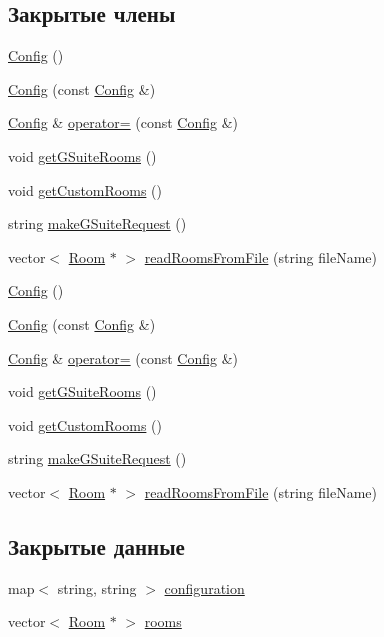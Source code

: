 \subsection*{Закрытые члены}
\begin{DoxyCompactItemize}
\item 
\hyperlink{class_config_abd0c571c116924871e30444b192b792a}{Config} ()
\item 
\hyperlink{class_config_add59e40b81cf0ffb43571bc201781dc0}{Config} (const \hyperlink{class_config}{Config} \&)
\item 
\hyperlink{class_config}{Config} \& \hyperlink{class_config_a301e8f32b1fad83bcab780bfa3fec1e9}{operator=} (const \hyperlink{class_config}{Config} \&)
\item 
void \hyperlink{class_config_a8a710b2b2b1e6280195389e9f84d0fba}{get\+G\+Suite\+Rooms} ()
\item 
void \hyperlink{class_config_af15e32047889f0d0e304cf4f5f218711}{get\+Custom\+Rooms} ()
\item 
string \hyperlink{class_config_a45dfcb0ab6def40b1ee15a0521a717ac}{make\+G\+Suite\+Request} ()
\item 
vector$<$ \hyperlink{class_room}{Room} $\ast$ $>$ \hyperlink{class_config_a585a61660c48877296ed9409c83b01c5}{read\+Rooms\+From\+File} (string file\+Name)
\item 
\hyperlink{class_config_abd0c571c116924871e30444b192b792a}{Config} ()
\item 
\hyperlink{class_config_add59e40b81cf0ffb43571bc201781dc0}{Config} (const \hyperlink{class_config}{Config} \&)
\item 
\hyperlink{class_config}{Config} \& \hyperlink{class_config_a301e8f32b1fad83bcab780bfa3fec1e9}{operator=} (const \hyperlink{class_config}{Config} \&)
\item 
void \hyperlink{class_config_a8a710b2b2b1e6280195389e9f84d0fba}{get\+G\+Suite\+Rooms} ()
\item 
void \hyperlink{class_config_af15e32047889f0d0e304cf4f5f218711}{get\+Custom\+Rooms} ()
\item 
string \hyperlink{class_config_a45dfcb0ab6def40b1ee15a0521a717ac}{make\+G\+Suite\+Request} ()
\item 
vector$<$ \hyperlink{class_room}{Room} $\ast$ $>$ \hyperlink{class_config_a8da1c4e1553854e6f248867f168de9ad}{read\+Rooms\+From\+File} (string file\+Name)
\end{DoxyCompactItemize}
\subsection*{Закрытые данные}
\begin{DoxyCompactItemize}
\item 
map$<$ string, string $>$ \hyperlink{class_config_a0b04d0c5fab98d257b2cf28cab895a3c}{configuration}
\item 
vector$<$ \hyperlink{class_room}{Room} $\ast$ $>$ \hyperlink{class_config_a13e9d9cfc3a9de64415d2674c6ecaf5c}{rooms}
\end{DoxyCompactItemize}



